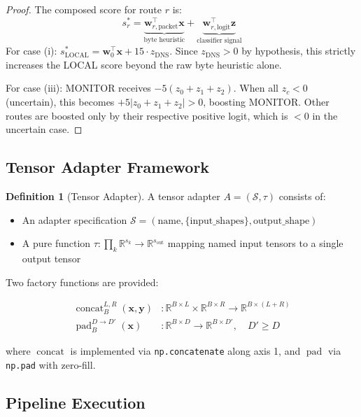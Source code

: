 \documentclass[11pt,a4paper,twoside]{article}
\theoremstyle{definition}
\newtheorem{definition}{Definition}[section]
\theoremstyle{remark}
\newcommand{\R}{\mathbb{R}}
\newcommand{\concat}{\operatorname{concat}}
\newcommand{\pad}{\operatorname{pad}}
\newcommand{\vect}[1]{\mathbf{#1}}
\begin{document}
\begin{proof}
The composed score for route $r$ is:
\begin{equation}
s_r^* = \underbrace{\vect{w}_{r,\text{packet}}^\top \vect{x}}_{\text{byte heuristic}} + \underbrace{\vect{w}_{r,\text{logit}}^\top \vect{z}}_{\text{classifier signal}}
\end{equation}
For case (i): $s_{\text{LOCAL}}^* = \vect{w}_{0}^\top \vect{x} + 15 \cdot z_{\text{DNS}}$. Since $z_{\text{DNS}} > 0$ by hypothesis, this strictly increases the LOCAL score beyond the raw byte heuristic alone.

For case (iii): MONITOR receives $-5(z_0 + z_1 + z_2)$. When all $z_c < 0$ (uncertain), this becomes $+5|z_0 + z_1 + z_2| > 0$, boosting MONITOR. Other routes are boosted only by their respective positive logit, which is $< 0$ in the uncertain case.
\end{proof}

\subsection{Tensor Adapter Framework}

\begin{definition}[Tensor Adapter]
\label{def:adapter}
A tensor adapter $A = (\mathcal{S}, \tau)$ consists of:
\begin{itemize}
  \item An adapter specification $\mathcal{S} = (\text{name}, \{\text{input\_shapes}\}, \text{output\_shape})$
  \item A pure function $\tau: \prod_{k} \R^{s_k} \to \R^{s_{\text{out}}}$ mapping named input tensors to a single output tensor
\end{itemize}
\end{definition}

Two factory functions are provided:

\begin{align}
\concat_B^{L,R}(\vect{x}, \vect{y}) &: \R^{B \times L} \times \R^{B \times R} \to \R^{B \times (L+R)} \label{eq:concat} \\
\pad_B^{D \to D'}(\vect{x}) &: \R^{B \times D} \to \R^{B \times D'}, \quad D' \geq D \label{eq:pad}
\end{align}

where $\concat$ is implemented via \texttt{np.concatenate} along axis 1, and $\pad$ via \texttt{np.pad} with zero-fill.

\subsection{Pipeline Execution}
\end{document}
